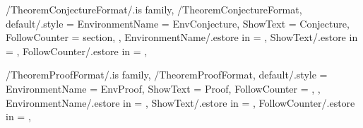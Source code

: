 \newcommand{\InsertProposition}[2][\empty]
{%
  \InsertTheoremContent[#1]{\GetTheoremPropositionFormatEnvironmentName}{#2}%
} %

\newcommand{\InitTheoremPropositionFormat}
{%
  \ifthenelse{\equal{\GetTheoremPropositionFormatFollowCounter}{\empty}}%
  {%
    \newtheorem{%
      \GetTheoremPropositionFormatEnvironmentName}{%
      \GetTheoremPropositionFormatShowText}%
  }%
  {%
    \newtheorem{%
      \GetTheoremPropositionFormatEnvironmentName}{%
      \GetTheoremPropositionFormatShowText}[%
      \GetTheoremPropositionFormatFollowCounter]%
  }%
} %


\pgfkeys
{
  /TheoremConjectureFormat/.is family, /TheoremConjectureFormat,
  default/.style =
  {
    EnvironmentName = {EnvConjecture},
    ShowText = {Conjecture},
    FollowCounter = section,
  },
  EnvironmentName/.estore in = \GetTheoremConjectureFormatEnvironmentName,
  ShowText/.estore in = \GetTheoremConjectureFormatShowText,
  FollowCounter/.estore in = \GetTheoremConjectureFormatFollowCounter,
} %

\newcommand{\InsertConjecture}[2][\empty]
{%
  \InsertTheoremContent[#1]{\GetTheoremConjectureFormatEnvironmentName}{#2}%
} %

\newcommand{\InitTheoremConjectureFormat}
{%
  \ifthenelse{\equal{\GetTheoremConjectureFormatFollowCounter}{\empty}}%
  {%
    \newtheorem{%
      \GetTheoremConjectureFormatEnvironmentName}{%
      \GetTheoremConjectureFormatShowText}%
  }%
  {%
    \newtheorem{%
      \GetTheoremConjectureFormatEnvironmentName}{%
      \GetTheoremConjectureFormatShowText}[%
      \GetTheoremConjectureFormatFollowCounter]%
  }%
} %


\pgfkeys
{
  /TheoremProofFormat/.is family, /TheoremProofFormat,
  default/.style =
  {
    EnvironmentName = {EnvProof},
    ShowText = {Proof},
    FollowCounter = \empty,
  },
  EnvironmentName/.estore in = \GetTheoremProofFormatEnvironmentName,
  ShowText/.estore in = \GetTheoremProofFormatShowText,
  FollowCounter/.estore in = \GetTheoremProofFormatFollowCounter,
} %

\newcommand{\InsertProof}[1]
{%
  \InsertTheoremContent[\empty]{%
    \GetTheoremProofFormatEnvironmentName}{#1}%
} %

